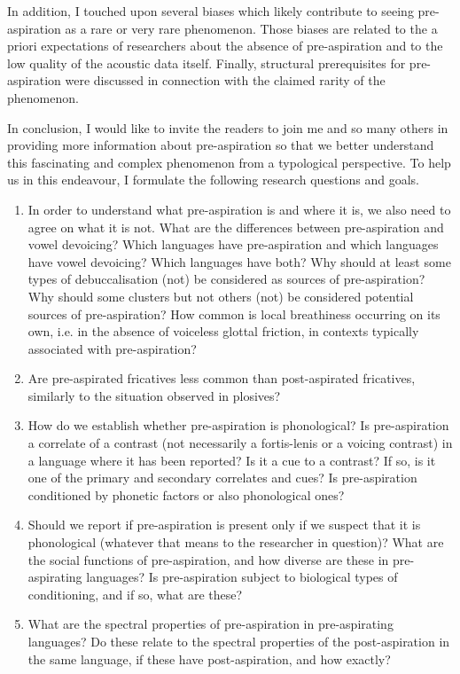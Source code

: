 \documentclass[output=paper]{langscibook}
\begin{document}
In addition, I touched upon several biases which likely contribute to seeing pre\hyp aspiration as a rare or very rare phenomenon. Those biases are related to the a priori expectations of researchers about the absence of pre\hyp aspiration and to the low quality of the acoustic data itself. Finally, structural prerequisites for pre\hyp aspiration were discussed in connection with the claimed rarity of the phenomenon.

In conclusion, I would like to invite the readers to join me and so many others in providing more information about pre\hyp aspiration so that we better understand this fascinating and complex phenomenon from a typological perspective. To help us in this endeavour, I formulate the following research questions and goals.

\begin{enumerate}
\item In order to understand what pre\hyp aspiration is and where it is, we also need to agree on what it is not. What are the differences between pre\hyp aspiration and vowel devoicing? Which languages have pre\hyp aspiration and which languages have vowel devoicing? Which languages have both? Why should at least some types of debuccalisation (not) be considered as sources of pre-aspiration? Why should some clusters but not others (not) be considered potential sources of pre-aspiration? How common is local breathiness occurring on its own, i.e. in the absence of voiceless glottal friction, in contexts typically associated with pre-aspiration?
\item Are pre-aspirated fricatives less common than post-aspirated fricatives, similarly to the situation observed in plosives?
\item How do we establish whether pre\hyp aspiration is phonological? Is pre\hyp aspiration a correlate of a contrast (not necessarily a fortis-lenis or a voicing contrast) in a language where it has been reported? Is it a cue to a contrast? If so, is it one of the primary and secondary correlates and cues? Is pre\hyp aspiration conditioned by phonetic factors or also phonological ones?
\item Should we report if pre\hyp aspiration is present only if we suspect that it is phonological (whatever that means to the researcher in question)? What are the social functions of pre-aspiration, and how diverse are these in pre-aspirating languages? Is pre\hyp aspiration subject to biological types of conditioning, and if so, what are these?
\item What are the spectral properties of pre\hyp aspiration in pre-aspirating languages? Do these relate to the spectral properties of the post-aspiration in the same language, if these have post-aspiration, and how exactly?

\end{enumerate}
\end{document}
